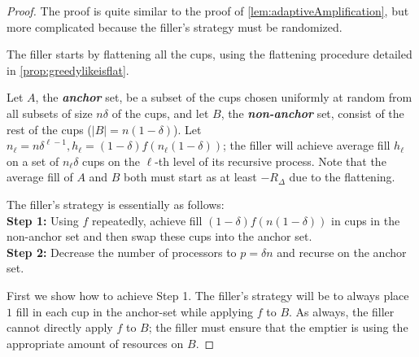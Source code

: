 \documentclass[twocolumn]{article}[10pt]
\newcommand{\defn}[1]{{\textit{\textbf{\boldmath #1}}}\xspace}
\begin{document}
\begin{proof}
  The proof is quite similar to the proof of 
  \cref{lem:adaptiveAmplification}, but more complicated because the filler's
  strategy must be randomized.

  The filler starts by flattening all the cups, using the flattening procedure
  detailed in \cref{prop:greedylikeisflat}. 

  Let $A$, the \defn{anchor} set, be a subset of the cups chosen uniformly at
  random from all subsets of size $n\delta$ of the cups, and let $B$, the
  \defn{non-anchor} set, consist of the rest of the cups ($|B| = n(1-\delta)$).
  Let $n_\ell = n\delta^{\ell-1}, h_\ell = (1-\delta)f(n_\ell(1-\delta))$; the
  filler will achieve average fill $h_\ell$ on a set of $n_\ell\delta$ cups on
  the $\ell$-th level of its recursive process. Note that the average fill of
  $A$ and $B$ both must start as at least $-R_\Delta$ due to the flattening.

  The filler's strategy is essentially as follows:\\
  \textbf{Step 1:} Using $f$ repeatedly, achieve fill
  $(1-\delta)f(n(1-\delta))$ in cups in the non-anchor set and then swap these
  cups into the anchor set.  \\
  \textbf{Step 2:} Decrease the number of processors to $p=\delta n$ and
  recurse on the anchor set.

  First we show how to achieve Step 1. 
  The filler's strategy will be to always place $1$ fill in each cup in the
  anchor-set while applying $f$ to $B$.
  As always, the filler cannot directly apply $f$ to $B$; the filler must ensure that
  the emptier is using the appropriate amount of resources on $B$.


\end{proof}
\end{document}

